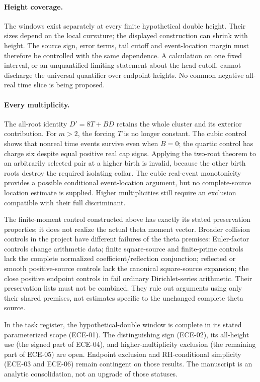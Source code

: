 \paragraph{Height coverage.}
The windows exist separately at every finite hypothetical double
height. Their sizes depend on the local curvature; the displayed
construction can shrink with height. The source sign, error terms,
tail cutoff and event-location margin must therefore be controlled with
the same dependence. A calculation on one fixed interval, or an
unquantified limiting statement about the head cutoff, cannot discharge
the universal quantifier over endpoint heights. No common negative
all-real time slice is being proposed.

\paragraph{Every multiplicity.}
The all-root identity $D'=8T+BD$ retains the whole cluster and its
exterior contribution. For $m>2$, the forcing $T$ is no longer constant.
The cubic control shows that nonreal time events survive even when
$B=0$; the quartic control has charge six despite equal positive real
cap signs. Applying the two-root theorem to an arbitrarily selected
pair at a higher birth is invalid, because the other birth roots
destroy the required isolating collar. The cubic real-event monotonicity
provides a possible conditional event-location argument, but no
complete-source location estimate is supplied. Higher multiplicities
still require an exclusion compatible with their full discriminant.

The finite-moment control constructed above has exactly its stated
preservation properties; it does not realize the actual theta moment
vector. Broader collision controls in the project have different
failures of the theta premises: Euler-factor controls change arithmetic
data; finite square-source and finite-prime controls lack the complete
normalized coefficient/reflection conjunction; reflected or smooth
positive-source controls lack the canonical square-source expansion;
the close positive endpoint controls in \cite{bw10control} fail ordinary
Dirichlet-series arithmetic. Their preservation lists must not be
combined. They rule out arguments using only their shared premises,
not estimates specific to the unchanged complete theta source.

In the task register, the hypothetical-double window is complete in
its stated parameterized scope (ECE-01). The distinguishing sign
(ECE-02), its all-height use (the signed part of ECE-04), and
higher-multiplicity exclusion (the remaining part of ECE-05) are open.
Endpoint exclusion and RH-conditional simplicity (ECE-03 and ECE-06)
remain contingent on those results. The manuscript is an analytic
consolidation, not an upgrade of those statuses.

